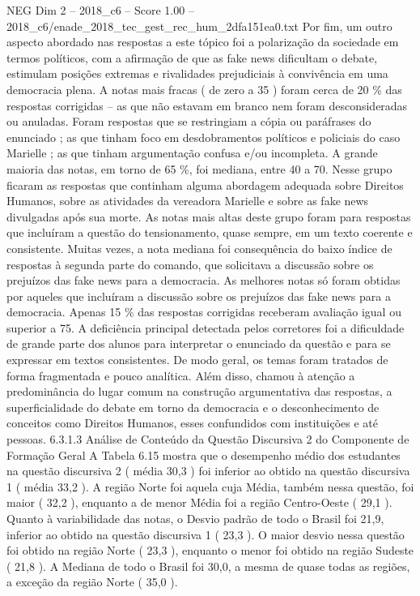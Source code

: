 \begin{textsample}{NEG Dim 2 – 2018\_c6 – Score 1.00 – 2018\_c6/enade\_2018\_tec\_gest\_rec\_hum\_2dfa151ea0.txt}
Por fim, um outro aspecto abordado nas respostas a este tópico foi a polarização da sociedade em termos políticos, com a afirmação de que as fake news dificultam o debate, estimulam posições extremas e rivalidades prejudiciais à convivência em uma democracia plena.
A notas mais fracas ( de zero a 35 ) foram cerca de 20 \% das respostas corrigidas – as que não estavam em branco nem foram desconsideradas ou anuladas.
Foram respostas que se restringiam a cópia ou paráfrases do enunciado ; as que tinham foco em desdobramentos políticos e policiais do caso Marielle ; as que tinham argumentação confusa e/ou incompleta.
A grande maioria das notas, em torno de 65 \%, foi mediana, entre 40 a 70.
Nesse grupo ficaram as respostas que continham alguma abordagem adequada sobre Direitos Humanos, sobre as atividades da vereadora Marielle e sobre as fake news divulgadas após sua morte.
As notas mais altas deste grupo foram para respostas que incluíram a questão do tensionamento, quase sempre, em um texto coerente e consistente.
Muitas vezes, a nota mediana foi consequência do baixo índice de respostas à segunda parte do comando, que solicitava a discussão sobre os prejuízos das fake news para a democracia.
As melhores notas só foram obtidas por aqueles que incluíram a discussão sobre os prejuízos das fake news para a democracia.
Apenas 15 \% das respostas corrigidas receberam avaliação igual ou superior a 75.
A deficiência principal detectada pelos corretores foi a dificuldade de grande parte dos alunos para interpretar o enunciado da questão e para se expressar em textos consistentes.
De modo geral, os temas foram tratados de forma fragmentada e pouco analítica.
Além disso, chamou à atenção a predominância do lugar comum na construção argumentativa das respostas, a superficialidade do debate em torno da democracia e o desconhecimento de conceitos como Direitos Humanos, esses confundidos com instituições e até pessoas. 6.3.1.3 Análise de Conteúdo da Questão Discursiva 2 do Componente de Formação Geral A Tabela 6.15 mostra que o desempenho médio dos estudantes na questão discursiva 2 ( média 30,3 ) foi inferior ao obtido na questão discursiva 1 ( média 33,2 ).
A região Norte foi aquela cuja Média, também nessa questão, foi maior ( 32,2 ), enquanto a de menor Média foi a região Centro-Oeste ( 29,1 ).
Quanto à variabilidade das notas, o Desvio padrão de todo o Brasil foi 21,9, inferior ao obtido na questão discursiva 1 ( 23,3 ).
O maior desvio nessa questão foi obtido na região Norte ( 23,3 ), enquanto o menor foi obtido na região Sudeste ( 21,8 ).
A Mediana de todo o Brasil foi 30,0, a mesma de quase todas as regiões, a exceção da região Norte ( 35,0 ).

\end{textsample}
